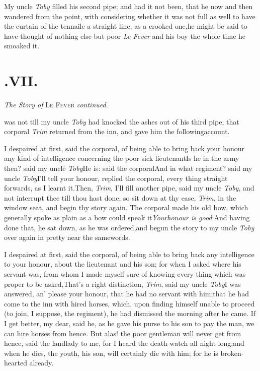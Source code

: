 \documentclass{article}
\begin{document}
My uncle \textit{Toby} filled his second pipe; and had it not
been, that he now and then wandered from the point, with
considering whether it was not full as well to have the curtain of the tennaile a straight
line, as a crooked one,\tsk he might be said to have thought of
nothing else but poor \textit{Le Fever} and his boy the whole time he
smoaked it.

\vfill{}\eject\null
\section{.\enspace VII.}

\medskip
\centerline{\textit{The Story of} \textsc{Le Fever} \textit{continued}.}

 was not till my uncle \textit{Toby} had knocked the
ashes out of his third pipe, that corporal \textit{Trim}
returned from the inn, and gave him the following\break account.

I despaired at first, said the corporal, of being able to bring
back your honour any kind of intelligence concerning the poor
sick lieutenant\tsk Is he in the army then? said my uncle
\textit{Toby}\tsh He is: said the corporal\tsh And in what
re\-giment? said my uncle \textit{Toby}\tsh I’ll tell your honour,
replied the corporal, every thing straight forwards, as I learnt
it.\tsk\break Then, \textit{Trim}, I’ll fill another pipe, said my
uncle \textit{Toby}, and not interrupt thee
till thou hast done; so sit down at thy ease, \textit{Trim}, in
the window seat, and begin thy story again. The corporal made
his old bow, which generally spoke as plain as a bow could speak
it\tsk \textit{Your\break honour is good}:\tsk And having done that,
he sat down, as he was ordered,\tsk\break and begun the story to my
uncle \textit{Toby} over again in pretty near the same\break words.

I despaired at first, said the corporal, of being able to bring
back any intelligence to your honour, about the lieutenant and his
son; for when I asked where his servant was, from whom I made
myself sure of knowing every thing which was proper to be
asked,\tsk\break That’s a right distinction, \textit{Trim}, said my
uncle \textit{Toby}\tsk I was answered, an’ please your
honour, that he had no servant 
with him;\tsh that he had come to the\break
inn with hired horses, which, upon\break
finding himself unable to proceed (to\break
join, I suppose, the regiment), he had\break
dismissed the morning after he came.\tsk\break
If I get better, my dear, said he, as he\break
gave his purse to his son to pay the man,\break
\tsk we can hire horses from hence.\tsh\break
But alas! the poor gentleman will never\break
get from hence, said the landlady to me,\break
\tsk for I heard the death-watch all night\break
long;\tsh and when he dies, the youth,\break
his son, will certainly die with him;\break
for he is broken-hearted already.
\end{document}
